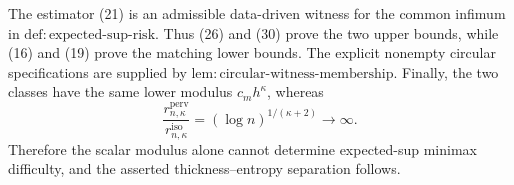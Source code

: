 The estimator (21) is an admissible data-driven witness for the common infimum in \(\mathrm{def:expected\text{-}sup\text{-}risk}\).  Thus (26) and (30) prove the two upper bounds, while (16) and (19) prove the matching lower bounds.  The explicit nonempty circular specifications are supplied by \(\mathrm{lem:circular\text{-}witness\text{-}membership}\).  Finally, the two classes have the same lower modulus \(c_mh^{\kappa}\), whereas
\[
 \frac{r_{n,\kappa}^{\mathrm{perv}}}
 {r_{n,\kappa}^{\mathrm{iso}}}
 =(\log n)^{1/(\kappa+2)}\longrightarrow\infty.
\]
Therefore the scalar modulus alone cannot determine expected-sup minimax difficulty, and the asserted thickness--entropy separation follows.